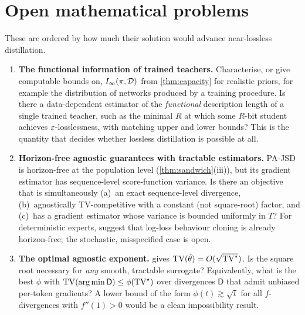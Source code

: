 \section{Open mathematical problems}\label{sec:open}

These are ordered by how much their solution would advance near-lossless distillation.

\begin{enumerate}[leftmargin=*,label=\textbf{P\arabic*.}]
\item \textbf{The functional information of trained teachers.} Characterise, or give computable bounds on,
$I_\infty(\pi,\mathcal{D})$ from \cref{thm:capacity} for realistic priors, for example the distribution of networks
produced by a training procedure. Is there a data-dependent estimator of the \emph{functional}
description length of a single trained teacher, such as the minimal $R$ at which some $R$-bit student
achieves $\varepsilon$-losslessness, with matching upper and lower bounds? This is the quantity that decides
whether lossless distillation is possible at all.

\item \textbf{Horizon-free agnostic guarantees with tractable estimators.} PA-JSD is horizon-free at the
population level (\cref{thm:sandwich}(iii)), but its gradient estimator has sequence-level score-function
variance. Is there an objective that is simultaneously (a)~an exact sequence-level divergence, (b)~agnostically
TV-competitive with a constant (not square-root) factor, and (c)~has a gradient estimator whose variance is
bounded uniformly in $T$? For deterministic experts, \citet{foster2024behavior} suggest that log-loss
behaviour cloning is already horizon-free; the stochastic, misspecified case is open.

\item \textbf{The optimal agnostic exponent.}  gives $\mathrm{TV}(\hat\theta)=O(\sqrt{\mathrm{TV}^\star})$. Is
the square root necessary for \emph{any} smooth, tractable surrogate? Equivalently, what is the best
$\phi$ with $\mathrm{TV}(\operatorname*{arg\,min}\mathsf D)\le\phi(\mathrm{TV}^\star)$ over divergences $\mathsf D$ that admit unbiased
per-token gradients? A lower bound of the form $\phi(t)\gtrsim\sqrt t$ for all $f$-divergences with $f''(1)>0$ would be
a clean impossibility result.


\end{enumerate}
